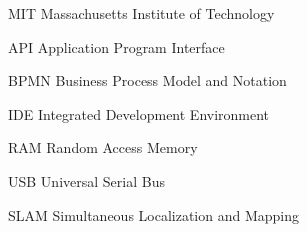 \begin{siglas}
  \item[MIT] Massachusetts Institute of Technology 
  \item[API] Application Program Interface 
  \item[BPMN] Business Process Model and Notation 
  \item[IDE] Integrated Development Environment
  \item[RAM] Random Access Memory
  \item[USB] Universal Serial Bus
  \item[SLAM] Simultaneous Localization and Mapping
\end{siglas}

